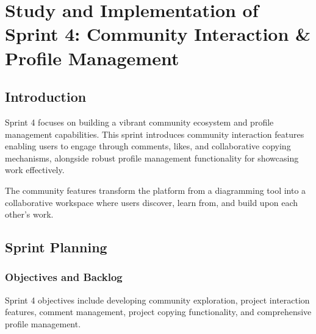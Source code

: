 \chapter[Sprint 4]{Study and Implementation of Sprint 4: Community Interaction \& Profile Management}

\section{Introduction}

Sprint 4 focuses on building a vibrant community ecosystem and profile management capabilities. This sprint introduces community interaction features enabling users to engage through comments, likes, and collaborative copying mechanisms, alongside robust profile management functionality for showcasing work effectively.

The community features transform the platform from a diagramming tool into a collaborative workspace where users discover, learn from, and build upon each other's work.

\section{Sprint Planning}

\subsection{Objectives and Backlog}

Sprint 4 objectives include developing community exploration, project interaction features, comment management, project copying functionality, and comprehensive profile management.

